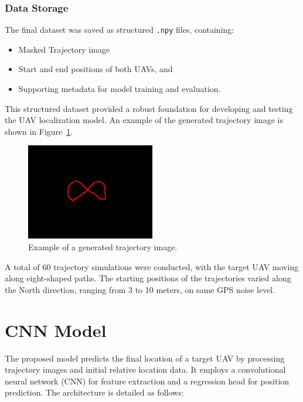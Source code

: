 \subsubsection{ Data Storage}
The final dataset was saved as structured \texttt{.npy} files, containing:
\begin{itemize}
    \item Masked Trajectory image
    \item Start and end positions of both UAVs, and
    \item Supporting metadata for model training and evaluation.
\end{itemize}

This structured dataset provided a robust foundation for developing and testing the UAV localization model. An example of the generated trajectory image is shown in Figure~\ref{fig:trajectory_image}.

\begin{figure}[H]
    \centering
    \includegraphics[width=0.5\textwidth]{Imgs/iris1_trajectory_masked.jpg}
    \caption{Example of a generated trajectory image.}
    \label{fig:trajectory_image}
\end{figure}

A total of 60 trajectory simulations were conducted, with the target UAV moving along eight-shaped paths. The starting positions of the trajectories varied along the 
North direction, ranging from 3 to 10 meters, on same GPS noise level.

\section{CNN Model}

The proposed model predicts the final location of a target UAV by processing trajectory images and initial relative location data. It employs a convolutional neural network (CNN) for feature extraction and a regression head for position prediction. The architecture is detailed as follows:

